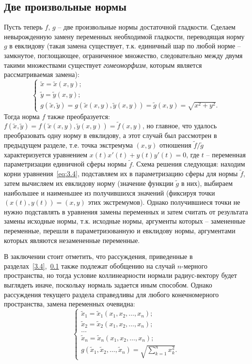 \documentclass{article}
\begin{document}
\subsection{Две произвольные нормы} \label{3.5}
Пусть теперь $f, \, g$ -- две произвольные нормы достаточной гладкости. Сделаем невырожденную замену переменных необходимой гладкости, переводящая норму $g$ в евклидову (такая замена существует, т.к. единичный шар по любой норме -- замкнутое, поглощающее, ограниченное множество, следовательно между двумя такими множествами существует \textit{гомеоморфизм}, которым является рассматриваемая замена):
\begin{equation*}
	\begin{cases}
		\tilde{x} = \tilde{x}(x, y); \\
		\tilde{y} = \tilde{y}(x, y); \\
		g(\tilde{x}, \tilde{y}) = g(\tilde{x}(x,y), \tilde{y}(x,y)) = \tilde{g}(x,y) = \sqrt{x^2+y^2}.
	\end{cases}
\end{equation*}
Тогда норма $f$ также преобразуется: $f(\tilde{x}, \tilde{y}) = f(\tilde{x}(x,y), \tilde{y}(x,y)) = \tilde{f}(x,y)$, но главное, что удалось преобразовать одну норму в евклидову, а этот случай был рассмотрен в предыдущем разделе, т.е. точка экстремума $(x,y)$ отношения $\tilde{f}/\tilde{g}$ характеризуется уравнением
$x(t)x'(t) + y(t)y'(t) = 0$, где $t$ -- переменная параметризации единичной сферы нормы $ \tilde{f}$. Схема решения следующая: находим корни уравнения~\eqref{eq:3.4}, подставляем их в параметризацию сферы для нормы $ \tilde{f}$, затем вычисляем их евклидову норму (значение функции $\tilde{g}$ в них), выбираем наибольшее и наименьшее из получившихся значений (фиксируя точки $(x(t),y(t)) = (x,y)$ этих экстремумов). Однако получившиеся точки не нужно подставлять в уравнения замены переменных и затем считать от результата замены исходные нормы, т.к. исходные нормы, аргументы которых -- замененные переменные, перешли в параметризованную и евклидову нормы, аргументами которых являются незамененные переменные.

\vspace{1mm}
В заключении стоит отметить, что рассуждения, приведенные в разделах~\ref{3.4},~\ref{3.5} также подлежат обобщению на случай $n$-мерного пространства, но тогда условие коллинеарности нормали радиус-вектору будет выглядеть иначе, поскольку нормаль задается иным способом. Однако рассуждения текущего раздела справедливы для любого конечномерного пространства, замена переменных очевидна:
\begin{equation}\label{replace}
	\begin{cases}
		\tilde{x}_1 = \tilde{x}_1(x_1,x_2,\ldots,x_n); \\
		\tilde{x}_2 = \tilde{x}_2(x_1,x_2,\ldots,x_n); \\
		\ldots \\
		\tilde{x}_n = \tilde{x}_n(x_1,x_2,\ldots,x_n); \\
		g(\tilde{x}_1, \tilde{x}_2, \ldots, \tilde{x}_n) = \sqrt{\sum\limits_{k=1}^n{x_k^2}}.
	\end{cases}
\end{equation}
\end{document}
